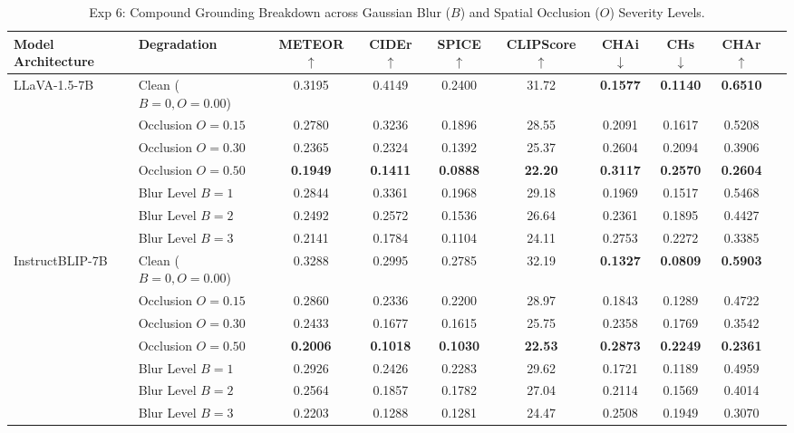 \documentclass[conference]{IEEEtran}
\begin{document}
\begin{table}[t]
\caption{Exp 6: Compound Grounding Breakdown across Gaussian Blur ($B$) and Spatial Occlusion ($O$) Severity Levels.}
\label{tab:exp6_degradation}
\centering
\begin{tabularx}{\textwidth}{llcccccccc}
\toprule
\textbf{Model Architecture} & \textbf{Degradation} & \textbf{METEOR} $\uparrow$ & \textbf{CIDEr} $\uparrow$ & \textbf{SPICE} $\uparrow$ & \textbf{CLIPScore} $\uparrow$ & \textbf{CHAi} $\downarrow$ & \textbf{CHs} $\downarrow$ & \textbf{CHAr} $\uparrow$ \\
\midrule
\multirow{7}{*}{LLaVA-1.5-7B} 
 & Clean ($B=0, O=0.00$)    & 0.3195 & 0.4149 & 0.2400 & 31.72 & \textbf{0.1577} & \textbf{0.1140} & \textbf{0.6510} \\
 & Occlusion $O=0.15$       & 0.2780 & 0.3236 & 0.1896 & 28.55 & 0.2091 & 0.1617 & 0.5208 \\
 & Occlusion $O=0.30$       & 0.2365 & 0.2324 & 0.1392 & 25.37 & 0.2604 & 0.2094 & 0.3906 \\
 & Occlusion $O=0.50$       & \textbf{0.1949} & \textbf{0.1411} & \textbf{0.0888} & \textbf{22.20} & \textbf{0.3117} & \textbf{0.2570} & \textbf{0.2604} \\
 \cmidrule{2-9}
 & Blur Level $B=1$         & 0.2844 & 0.3361 & 0.1968 & 29.18 & 0.1969 & 0.1517 & 0.5468 \\
 & Blur Level $B=2$         & 0.2492 & 0.2572 & 0.1536 & 26.64 & 0.2361 & 0.1895 & 0.4427 \\
 & Blur Level $B=3$         & 0.2141 & 0.1784 & 0.1104 & 24.11 & 0.2753 & 0.2272 & 0.3385 \\
\midrule
\multirow{7}{*}{InstructBLIP-7B} 
 & Clean ($B=0, O=0.00$)    & 0.3288 & 0.2995 & 0.2785 & 32.19 & \textbf{0.1327} & \textbf{0.0809} & \textbf{0.5903} \\
 & Occlusion $O=0.15$       & 0.2860 & 0.2336 & 0.2200 & 28.97 & 0.1843 & 0.1289 & 0.4722 \\
 & Occlusion $O=0.30$       & 0.2433 & 0.1677 & 0.1615 & 25.75 & 0.2358 & 0.1769 & 0.3542 \\
 & Occlusion $O=0.50$       & \textbf{0.2006} & \textbf{0.1018} & \textbf{0.1030} & \textbf{22.53} & \textbf{0.2873} & \textbf{0.2249} & \textbf{0.2361} \\
 \cmidrule{2-9}
 & Blur Level $B=1$         & 0.2926 & 0.2426 & 0.2283 & 29.62 & 0.1721 & 0.1189 & 0.4959 \\
 & Blur Level $B=2$         & 0.2564 & 0.1857 & 0.1782 & 27.04 & 0.2114 & 0.1569 & 0.4014 \\
 & Blur Level $B=3$         & 0.2203 & 0.1288 & 0.1281 & 24.47 & 0.2508 & 0.1949 & 0.3070 \\
\bottomrule
\end{tabularx}
\end{table}
\end{document}
